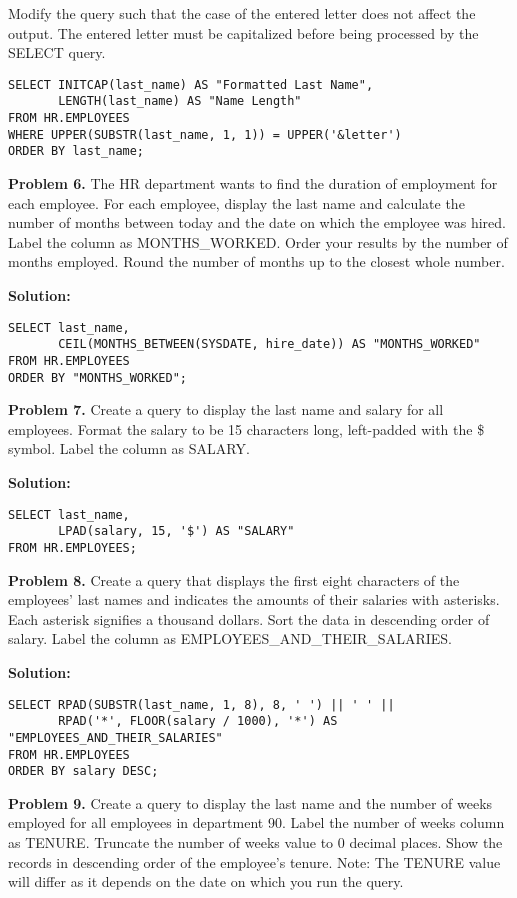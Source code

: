 \documentclass[12pt,a4paper]{article}
\begin{document}
Modify the query such that the case of the entered letter does not affect the output. The entered letter must be capitalized before being processed by the SELECT query.

\begin{lstlisting}[style=sqlstyle]
SELECT INITCAP(last_name) AS "Formatted Last Name",
       LENGTH(last_name) AS "Name Length"
FROM HR.EMPLOYEES
WHERE UPPER(SUBSTR(last_name, 1, 1)) = UPPER('&letter')
ORDER BY last_name;
\end{lstlisting}

\textbf{Problem 6.} The HR department wants to find the duration of employment for each employee. For each employee, display the last name and calculate the number of months between today and the date on which the employee was hired. Label the column as MONTHS\_WORKED. Order your results by the number of months employed. Round the number of months up to the closest whole number.

\textbf{Solution:}
\begin{lstlisting}[style=sqlstyle]
SELECT last_name,
       CEIL(MONTHS_BETWEEN(SYSDATE, hire_date)) AS "MONTHS_WORKED"
FROM HR.EMPLOYEES
ORDER BY "MONTHS_WORKED";
\end{lstlisting}

\textbf{Problem 7.} Create a query to display the last name and salary for all employees. Format the salary to be 15 characters long, left-padded with the \$ symbol. Label the column as SALARY.

\textbf{Solution:}
\begin{lstlisting}[style=sqlstyle]
SELECT last_name,
       LPAD(salary, 15, '$') AS "SALARY"
FROM HR.EMPLOYEES;
\end{lstlisting}

\textbf{Problem 8.} Create a query that displays the first eight characters of the employees' last names and indicates the amounts of their salaries with asterisks. Each asterisk signifies a thousand dollars. Sort the data in descending order of salary. Label the column as EMPLOYEES\_AND\_THEIR\_SALARIES.

\textbf{Solution:}
\begin{lstlisting}[style=sqlstyle]
SELECT RPAD(SUBSTR(last_name, 1, 8), 8, ' ') || ' ' ||
       RPAD('*', FLOOR(salary / 1000), '*') AS "EMPLOYEES_AND_THEIR_SALARIES"
FROM HR.EMPLOYEES
ORDER BY salary DESC;
\end{lstlisting}

\textbf{Problem 9.} Create a query to display the last name and the number of weeks employed for all employees in department 90. Label the number of weeks column as TENURE. Truncate the number of weeks value to 0 decimal places. Show the records in descending order of the employee's tenure. Note: The TENURE value will differ as it depends on the date on which you run the query.
\end{document}
